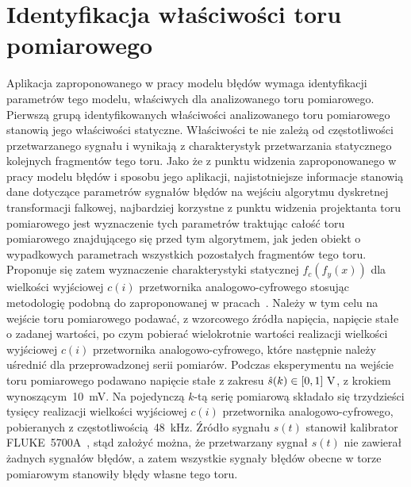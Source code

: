 \section{Identyfikacja właściwości toru pomiarowego}

Aplikacja zaproponowanego w pracy modelu błędów wymaga identyfikacji parametrów tego modelu, właściwych dla analizowanego toru pomiarowego. Pierwszą grupą identyfikowanych właściwości analizowanego toru pomiarowego stanowią jego właściwości statyczne. Właściwości te nie zależą od częstotliwości przetwarzanego sygnału i wynikają z charakterystyk przetwarzania statycznego kolejnych fragmentów tego toru. Jako że z punktu widzenia zaproponowanego w pracy modelu błędów i sposobu jego aplikacji, najistotniejsze informacje stanowią dane dotyczące parametrów sygnałów błędów na wejściu algorytmu dyskretnej transformacji falkowej, najbardziej korzystne z punktu widzenia projektanta toru pomiarowego jest wyznaczenie tych parametrów traktując całość toru pomiarowego znajdującego się przed tym algorytmem, jak jeden obiekt o wypadkowych parametrach wszystkich pozostałych fragmentów tego toru. Proponuje się zatem wyznaczenie charakterystyki statycznej $f_{c}(f_{y}(x))$ dla wielkości wyjściowej $c(i)$ przetwornika analogowo-cyfrowego stosując metodologię podobną do zaproponowanej w pracach~\cite{kampik_przetworniki, auth_model}. Należy w tym celu na wejście toru pomiarowego podawać, z wzorcowego źródła napięcia, napięcie stałe o zadanej wartości, po czym pobierać wielokrotnie wartości realizacji wielkości wyjściowej $c(i)$ przetwornika analogowo-cyfrowego, które następnie należy uśrednić dla przeprowadzonej serii pomiarów. Podczas eksperymentu na wejście toru pomiarowego podawano napięcie stałe z zakresu $\hat{s}(k) \in \interval{0}{1}~\unit{V}$, z krokiem wynoszącym~\qty{10}{mV}. Na pojedynczą $k$-tą serię pomiarową składało się trzydzieści tysięcy realizacji wielkości wyjściowej $c(i)$ przetwornika analogowo-cyfrowego, pobieranych z częstotliwością~\qty{48}{kHz}. Źródło sygnału $s(t)$ stanowił kalibrator FLUKE~5700A~\cite{fluke_manual}, stąd założyć można, że przetwarzany sygnał $s(t)$ nie zawierał żadnych sygnałów błędów, a zatem wszystkie sygnały błędów obecne w torze pomiarowym stanowiły błędy własne tego toru.


